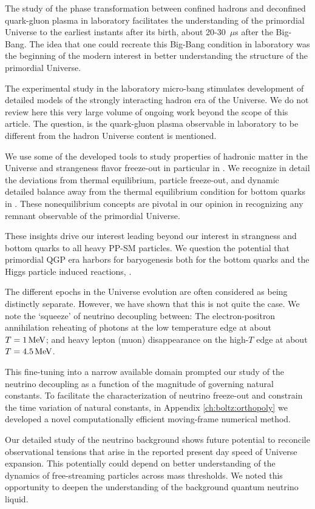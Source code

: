 The study of the phase transformation between confined hadrons and deconfined quark-gluon plasma in laboratory facilitates the understanding of the primordial Universe to the earliest instants after its birth, about 20-30\, $\mu$s after the Big-Bang. The idea that one could recreate this Big-Bang condition in laboratory was the beginning of the modern interest in better understanding the structure of the primordial Universe. 

The experimental study in the laboratory micro-bang stimulates development of detailed models of the strongly interacting hadron era of the Universe. We do not review here this very large volume of ongoing work beyond the scope of this article. The question, is the quark-gluon plasma observable in laboratory to be different from the hadron Universe content is mentioned. 

We use some of the developed tools to study properties of hadronic matter in the Universe and strangeness flavor freeze-out in particular in . We recognize in detail the deviations from thermal equilibrium, particle freeze-out, and dynamic detailed balance away from the thermal equilibrium condition for bottom quarks in . These nonequilibrium concepts are pivotal in our opinion in recognizing any remnant observable of the primordial Universe. 

These insights drive our interest leading beyond our interest in strangness and bottom quarks to all heavy PP-SM particles. We question the potential that primordial QGP era harbors for baryogenesis both for the bottom quarks and the Higgs particle induced reactions, .

The different epochs in the Universe evolution are often considered as being distinctly separate. However, we have shown that this is not quite the case. We note the `squeeze' of neutrino decoupling between: The electron-positron annihilation reheating of photons at the low temperature edge at about $T=1\text{\,MeV}$; and heavy lepton (muon) disappearance on the high-$T$ edge at about $T=4.5\text{\,MeV}$. 

This fine-tuning into a narrow available domain prompted our study of the neutrino decoupling as a function of the magnitude of governing natural constants. To facilitate the characterization of neutrino freeze-out and constrain the time variation of natural constants, in Appendix \ref{ch:boltz:orthopoly} we developed a novel computationally efficient moving-frame numerical method.

Our detailed study of the neutrino background shows future potential to reconcile observational tensions that arise in the reported present day speed of Universe expansion. This potentially could depend on better understanding of the dynamics of free-streaming particles across mass thresholds. We noted this opportunity to deepen the understanding of the background quantum neutrino liquid.

